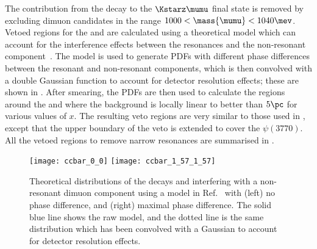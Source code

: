 The contribution from the decay \decay{\phi}{\mumu} to the $\Kstarz\mumu$ final state is removed by
excluding dimuon candidates in the range $1000<\mass{\mumu}<1040\mev$.
Vetoed regions for the \jpsi and \psitwos are calculated using a theoretical
model which can account for the interference effects between the
\decay{\ccbar}{\mumu} resonances and the non-resonant \mumu component~\cite{Bobeth:2011nj}.
The model is used to generate \glspl{PDF} with different phase differences between the resonant and
non-resonant components, which is then convolved with a double Gaussian function to account for
detector resolution effects; these are shown in .
After smearing, the \glspl{PDF} are then used to
calculate the regions around the \jpsi and \psitwos where the
background is locally linear to better than $5\pc$ for various values of $x$.
The resulting veto regions are very similar to those used in
, except that the upper boundary of the \psitwos veto is extended to cover
the $\psi(3770)$.
All the vetoed regions to remove narrow resonances are summarised in
.


\begin{figure}
  \begin{center}
    \texttt{[image: ccbar\_0\_0]}
    \texttt{[image: ccbar\_1\_57\_1\_57]}
    \caption[Theoretical distributions of \ccbar resonances interfering with a non-resonant
    component]
    {
      Theoretical distributions of the decays \jpsitomumu and \decay{\psitwos}{\mumu} interfering
      with a non-resonant dimuon component using a model in Ref.~\protect\cite{Bobeth:2011nj} with
      (left) no phase difference, and
      (right) maximal phase difference.
      The solid blue line shows the raw model, and the dotted line is the same distribution which
      has been convolved with a Gaussian to account for detector resolution effects.
    }
    \label{fig:db:ccbar}
  \end{center}
\end{figure}



